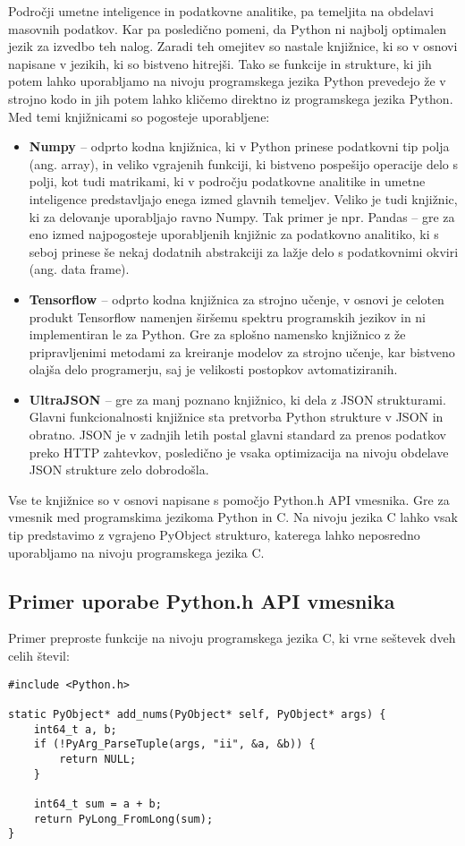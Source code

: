 \documentclass[a4paper,12pt,openright]{book}
\begin{document}
    Področji umetne inteligence in podatkovne analitike, pa temeljita na obdelavi masovnih podatkov. Kar pa posledično pomeni, da Python ni najbolj optimalen jezik za izvedbo teh nalog. Zaradi teh omejitev so nastale knjižnice, ki so v osnovi napisane v jezikih, ki so bistveno hitrejši. Tako se funkcije in strukture, ki jih potem lahko uporabljamo na nivoju programskega jezika Python prevedejo že v strojno kodo in jih potem lahko kličemo direktno iz programskega jezika Python. Med temi knjižnicami so pogosteje uporabljene:
    \begin{itemize}
        \item \textbf{Numpy \cite{NUMPY_GITHUB}} – odprto kodna knjižnica, ki v Python prinese podatkovni tip polja (ang. array), in veliko vgrajenih funkciji, ki bistveno pospešijo operacije delo s polji, kot tudi matrikami, ki v področju podatkovne analitike in umetne inteligence predstavljajo enega izmed glavnih temeljev. Veliko je tudi knjižnic, ki za delovanje uporabljajo ravno Numpy. Tak primer je npr. Pandas \cite{PANDAS_GITHUB} – gre za eno izmed najpogosteje uporabljenih knjižnic za podatkovno analitiko, ki s seboj prinese še nekaj dodatnih abstrakciji za lažje delo s podatkovnimi okviri (ang. data frame).
        \item \textbf{Tensorflow \cite{TENSORFLOW_GITHUB}} –  odprto kodna knjižnica za strojno učenje, v osnovi je celoten produkt Tensorflow namenjen širšemu spektru programskih jezikov in ni implementiran le za Python. Gre za splošno namensko knjižnico z že pripravljenimi metodami za kreiranje modelov za strojno učenje, kar bistveno olajša delo programerju, saj je velikosti postopkov avtomatiziranih.
        \item \textbf{UltraJSON \cite{UJSON_GITHUB}} – gre za manj poznano knjižnico, ki dela z JSON strukturami. Glavni funkcionalnosti knjižnice sta pretvorba Python strukture v JSON in obratno. JSON je v zadnjih letih postal glavni standard za prenos podatkov preko HTTP zahtevkov, posledično je vsaka optimizacija na nivoju obdelave JSON strukture zelo dobrodošla. 
    \end{itemize}

    \noindent
    Vse te knjižnice so v osnovi napisane s pomočjo Python.h API vmesnika. Gre za vmesnik med programskima jezikoma Python in C. Na nivoju jezika C lahko vsak tip predstavimo z vgrajeno PyObject strukturo, katerega lahko neposredno uporabljamo na nivoju programskega jezika C. 

    \subsection{Primer uporabe Python.h API vmesnika}
    Primer preproste funkcije na nivoju programskega jezika C, ki vrne seštevek dveh celih števil:
\begin{verbatim}
#include <Python.h>

static PyObject* add_nums(PyObject* self, PyObject* args) {
    int64_t a, b;
    if (!PyArg_ParseTuple(args, "ii", &a, &b)) {
        return NULL;
    }

    int64_t sum = a + b;
    return PyLong_FromLong(sum);
}
\end{verbatim}
\end{document}
